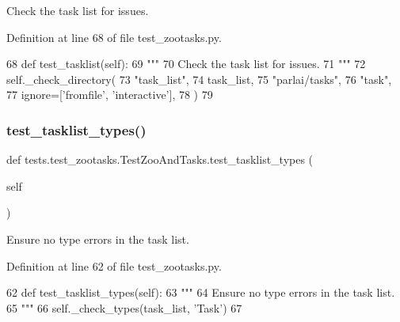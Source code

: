 \begin{DoxyVerb}Check the task list for issues.
\end{DoxyVerb}
 

Definition at line 68 of file test\+\_\+zootasks.\+py.


\begin{DoxyCode}
68     \textcolor{keyword}{def }test\_tasklist(self):
69         \textcolor{stringliteral}{"""}
70 \textcolor{stringliteral}{        Check the task list for issues.}
71 \textcolor{stringliteral}{        """}
72         self.\_check\_directory(
73             \textcolor{stringliteral}{"task\_list"},
74             task\_list,
75             \textcolor{stringliteral}{"parlai/tasks"},
76             \textcolor{stringliteral}{"task"},
77             ignore=[\textcolor{stringliteral}{'fromfile'}, \textcolor{stringliteral}{'interactive'}],
78         )
79 
\end{DoxyCode}
\mbox{\label{classtests_1_1test__zootasks_1_1TestZooAndTasks_ae25086584b24c10c24a9bda486b32c4a}} 
\subsubsection{\texorpdfstring{test\+\_\+tasklist\+\_\+types()}{test\_tasklist\_types()}}
{\footnotesize\ttfamily def tests.\+test\+\_\+zootasks.\+Test\+Zoo\+And\+Tasks.\+test\+\_\+tasklist\+\_\+types (\begin{DoxyParamCaption}\item[{}]{self }\end{DoxyParamCaption})}

\begin{DoxyVerb}Ensure no type errors in the task list.
\end{DoxyVerb}
 

Definition at line 62 of file test\+\_\+zootasks.\+py.


\begin{DoxyCode}
62     \textcolor{keyword}{def }test\_tasklist\_types(self):
63         \textcolor{stringliteral}{"""}
64 \textcolor{stringliteral}{        Ensure no type errors in the task list.}
65 \textcolor{stringliteral}{        """}
66         self.\_check\_types(task\_list, \textcolor{stringliteral}{'Task'})
67 
\end{DoxyCode}
\mbox{\label{classtests_1_1test__zootasks_1_1TestZooAndTasks_a1c1bb2568bc1871c11d14ac136a9e2b3}} 
